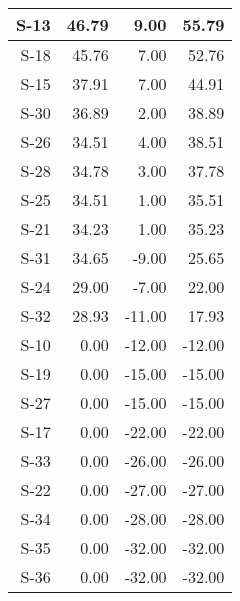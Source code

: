 \begin{tabular}{ | r | r | r | r | }
    \hline
                  S-13  &           46.79  &            9.00  &           55.79  \\
    \hline
                  S-18  &           45.76  &            7.00  &           52.76  \\
    \hline
                  S-15  &           37.91  &            7.00  &           44.91  \\
    \hline
                  S-30  &           36.89  &            2.00  &           38.89  \\
    \hline
                  S-26  &           34.51  &            4.00  &           38.51  \\
    \hline
                  S-28  &           34.78  &            3.00  &           37.78  \\
    \hline
                  S-25  &           34.51  &            1.00  &           35.51  \\
    \hline
                  S-21  &           34.23  &            1.00  &           35.23  \\
    \hline
                  S-31  &           34.65  &           -9.00  &           25.65  \\
    \hline
                  S-24  &           29.00  &           -7.00  &           22.00  \\
    \hline
                  S-32  &           28.93  &          -11.00  &           17.93  \\
    \hline
                  S-10  &            0.00  &          -12.00  &          -12.00  \\
    \hline
                  S-19  &            0.00  &          -15.00  &          -15.00  \\
    \hline
                  S-27  &            0.00  &          -15.00  &          -15.00  \\
    \hline
                  S-17  &            0.00  &          -22.00  &          -22.00  \\
    \hline
                  S-33  &            0.00  &          -26.00  &          -26.00  \\
    \hline
                  S-22  &            0.00  &          -27.00  &          -27.00  \\
    \hline
                  S-34  &            0.00  &          -28.00  &          -28.00  \\
    \hline
                  S-35  &            0.00  &          -32.00  &          -32.00  \\
    \hline
                  S-36  &            0.00  &          -32.00  &          -32.00  \\

\end{tabular}
